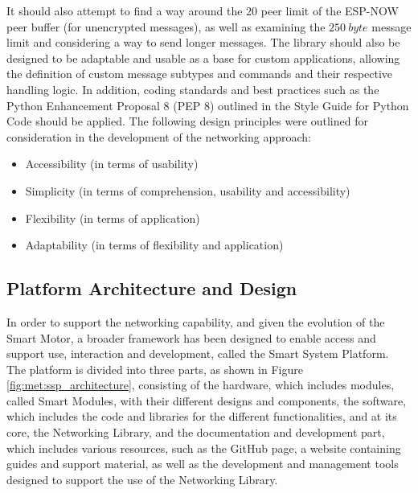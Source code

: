 It should also attempt to find a way around the $20$ peer limit of the ESP-NOW peer buffer (for unencrypted messages), as well as examining the $250\ byte$ message limit and considering a way to send longer messages.
The library should also be designed to be adaptable and usable as a base for custom applications, allowing the definition of custom message subtypes and commands and their respective handling logic.
In addition, coding standards and best practices such as the Python Enhancement Proposal 8 (PEP 8) outlined in the Style Guide for Python Code \citep{rossum_python_2001} should be applied. The following design principles were outlined for consideration in the development of the networking approach:
\begin{itemize}
    \item Accessibility (in terms of usability)
    \item Simplicity (in terms of comprehension, usability and accessibility)
    \item Flexibility (in terms of application)
    \item Adaptability (in terms of flexibility and application)
\end{itemize}
\newpage
\subsection{\label{sec:methods_ssp_des}Platform Architecture and Design}

In order to support the networking capability, and given the evolution of the Smart Motor, a broader framework has been designed to enable access and support use, interaction and development, called the Smart System Platform. \\

The platform is divided into three parts, as shown in Figure \ref{fig:met:ssp_architecture}, consisting of the hardware, which includes modules, called Smart Modules, with their different designs and components, the software, which includes the code and libraries for the different functionalities, and at its core, the Networking Library, and the documentation and development part, which includes various resources, such as the GitHub page, a website containing guides and support material, as well as the development and management tools designed to support the use of the Networking Library.

